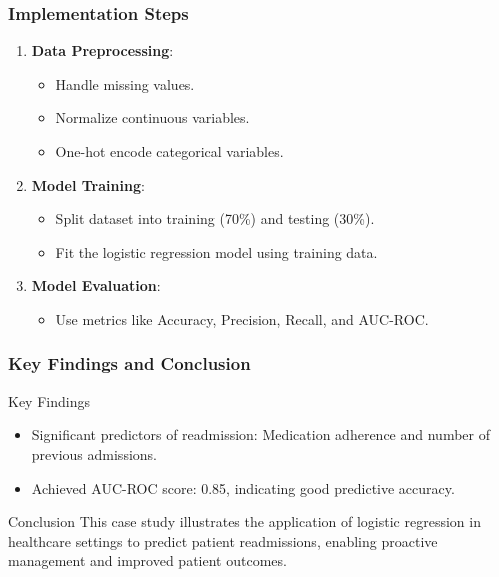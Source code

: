 \documentclass[aspectratio=169]{beamer}
\begin{document}
\begin{frame}[fragile]
    \frametitle{Implementation Steps}
    \begin{enumerate}
        \item \textbf{Data Preprocessing}:
            \begin{itemize}
                \item Handle missing values.
                \item Normalize continuous variables.
                \item One-hot encode categorical variables.
            \end{itemize}
        \item \textbf{Model Training}:
            \begin{itemize}
                \item Split dataset into training (70\%) and testing (30\%).
                \item Fit the logistic regression model using training data.
            \end{itemize}
        \item \textbf{Model Evaluation}:
            \begin{itemize}
                \item Use metrics like Accuracy, Precision, Recall, and AUC-ROC.
            \end{itemize}
    \end{enumerate}
\end{frame}

\begin{frame}[fragile]
    \frametitle{Key Findings and Conclusion}
    \begin{block}{Key Findings}
        \begin{itemize}
            \item Significant predictors of readmission: Medication adherence and number of previous admissions.
            \item Achieved AUC-ROC score: 0.85, indicating good predictive accuracy.
        \end{itemize}
    \end{block}
    
    \begin{block}{Conclusion}
        This case study illustrates the application of logistic regression in healthcare settings to predict patient readmissions, 
        enabling proactive management and improved patient outcomes.
    \end{block}
\end{frame}
\end{document}
